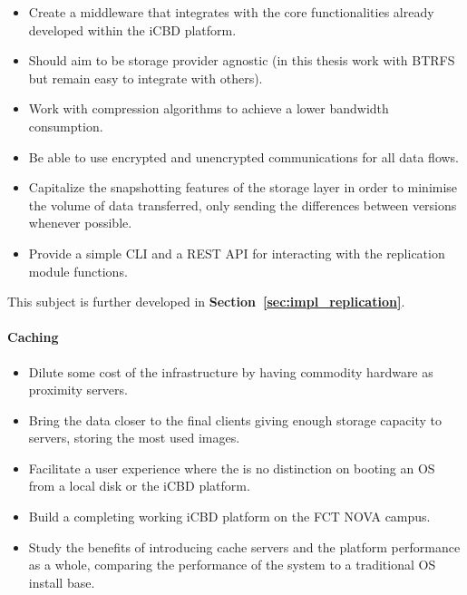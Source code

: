 \begin{itemize}
	\item Create a middleware that integrates with the core functionalities already developed within the iCBD platform.
	\item Should aim to be storage provider agnostic (in this thesis work with BTRFS but remain easy to integrate with others).
	\item Work with compression algorithms to achieve a lower bandwidth consumption.
	\item Be able to use encrypted and unencrypted communications for all data flows. 
	\item Capitalize the snapshotting features of the storage layer in order to minimise the volume of data transferred, only sending the differences between versions whenever possible.
	\item Provide a simple CLI and a REST API for interacting with the replication module functions.
\end{itemize}

This subject is further developed in \textbf{Section~\ref{sec:impl_replication}}.

\paragraph{Caching}
\label{par:caching_goals}

\begin{itemize}
	\item Dilute some cost of the infrastructure by having commodity hardware as proximity servers.
	\item Bring the data closer to the final clients giving enough storage capacity to servers, storing the most used images.
	\item Facilitate a user experience where the is no distinction on booting an OS from a local disk or the iCBD platform.
	\item Build a completing working iCBD platform on the FCT NOVA campus.
	\item Study the benefits of introducing cache servers and the platform performance as a whole, comparing the performance of the system to a traditional OS install base.  
\end{itemize}

